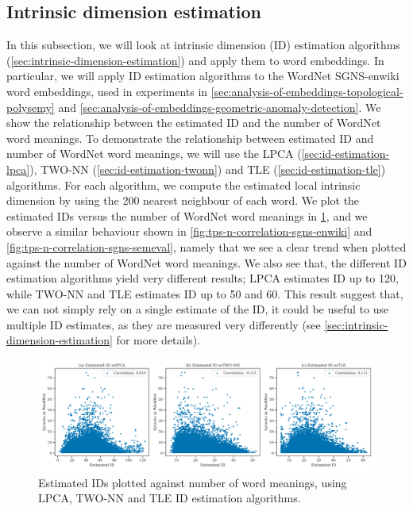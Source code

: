 \subsection{Intrinsic dimension estimation}
\label{sec:analysis-of-embeddings-intrinsic-dimension-estimation}
In this subsection, we will look at intrinsic dimension (ID) estimation algorithms (\cref{sec:intrinsic-dimension-estimation}) and apply them to word embeddings. In particular, we will apply ID estimation algorithms to the WordNet SGNS-enwiki word embeddings, used in experiments in \cref{sec:analysis-of-embeddings-topological-polysemy} and \cref{sec:analysis-of-embeddings-geometric-anomaly-detection}. We show the relationship between the estimated ID and the number of WordNet word meanings. To demonstrate the relationship between estimated ID and number of WordNet word meanings, we will use the LPCA (\cref{sec:id-estimation-lpca}), TWO-NN (\cref{sec:id-estimation-twonn}) and TLE (\cref{sec:id-estimation-tle}) algorithms. For each algorithm, we compute the estimated local intrinsic dimension by using the 200 nearest neighbour of each word. We plot the estimated IDs versus the number of WordNet word meanings in \cref{fig:intrinsic-dimension-estimation-vs-wordnet-synsets}, and we observe a similar behaviour shown in \cref{fig:tps-n-correlation-sgns-enwiki} and \cref{fig:tps-n-correlation-sgns-semeval}, namely that we see a clear trend when plotted against the number of WordNet word meanings. We also see that, the different ID estimation algorithms yield very different results; LPCA estimates ID up to 120, while TWO-NN and TLE estimates ID up to 50 and 60. This result suggest that, we can not simply rely on a single estimate of the ID, it could be useful to use multiple ID estimates, as they are measured very differently (see \cref{sec:intrinsic-dimension-estimation} for more details).
\begin{figure}[H]
    \centering
    \includegraphics[width=\textwidth]{thesis/figures/intrinsic-dimension-estimation-vs-wordnet-synsets.pdf}
    \caption{Estimated IDs plotted against number of word meanings, using LPCA, TWO-NN and TLE ID estimation algorithms.}
    \label{fig:intrinsic-dimension-estimation-vs-wordnet-synsets}
\end{figure}

